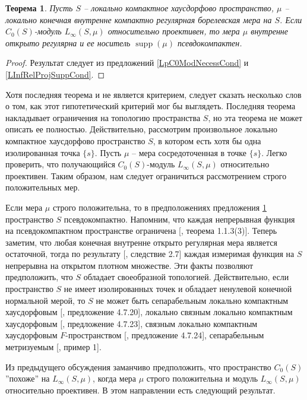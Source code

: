 \documentclass[12pt]{article}
\newtheorem{theorem}{Теорема}[section]
\begin{document}
\begin{theorem}\label{LInfReProjNecessCond} Пусть $S$ -- локально компактное хаусдорфово пространство, $\mu$ -- локально конечная внутренне компактно регулярная борелевская мера на $S$. Если $C_0(S)$-модуль $L_\infty(S,\mu)$ относительно проективен, то мера $\mu$ внутренне открыто регулярна и ее носитель $\operatorname{supp}(\mu)$ псевдокомпактен.

\end{theorem}
\begin{proof} Результат следует из предложений \ref{LpC0ModNecessCond} и \ref{LInfRelProjSuppCond}.
\end{proof}

Хотя последняя теорема и не является критерием, следует сказать несколько слов о том, как этот гипотетический критерий мог бы выглядеть. Последняя теорема накладывает ограничения на топологию пространства $S$, но эта теорема не может описать ее полностью. Действительно, рассмотрим произвольное локально компактное хаусдорфово пространство $S$, в котором есть хотя бы одна изолированная точка $\{s\}$. Пусть $\mu$ -- мера сосредоточенная в точке $\{s\}$. Легко проверить, что получающийся $C_0(S)$-модуль $L_\infty(S,\mu)$ относительно проективен. Таким образом, нам следует ограничиться рассмотрением строго положительных мер.

Если мера $\mu$ строго положительна, то в предположениях предложения \ref{LInfReProjNecessCond} пространство $S$ псевдокомпактно. Напомним, что каждая непрерывная функция на псевдокомпактном пространстве ограничена [\cite{HrusPseudCompTopSp}, теорема 1.1.3(3)]. Теперь заметим, что любая конечная внутренне открыто регулярная мера является остаточной, тогда по результату [\cite{ZindResMeasLocCompSp}, следствие 2.7] каждая измеримая функция на $S$ непрерывна на открытом плотном множестве. Эти факты позволяют предположить, что $S$ обладает своеобразной топологией. Действительно, если пространство $S$ не имеет изолированных точек и обладает ненулевой конечной нормальной мерой, то $S$ не может быть сепарабельным локально компактным хаусдорфовым [\cite{DalesBanSpContFunDualSp}, предложение 4.7.20], локально связным локально компактным хаусдорфовым [\cite{DalesBanSpContFunDualSp}, предложение 4.7.23], связным локально компактным хаусдорфовым $F$-пространством [\cite{DalesBanSpContFunDualSp}, предложение 4.7.24], сепарабельным метризуемым [\cite{FlachNormMeasTopSp}, пример 1].

Из предыдущего обсуждения заманчиво предположить, что пространство $C_0(S)$ ''похоже'' на  $L_\infty(S,\mu)$, когда мера $\mu$ строго положительна и модуль $L_\infty(S,\mu)$ относительно проективен. В этом направлении есть следующий результат.
\end{document}
